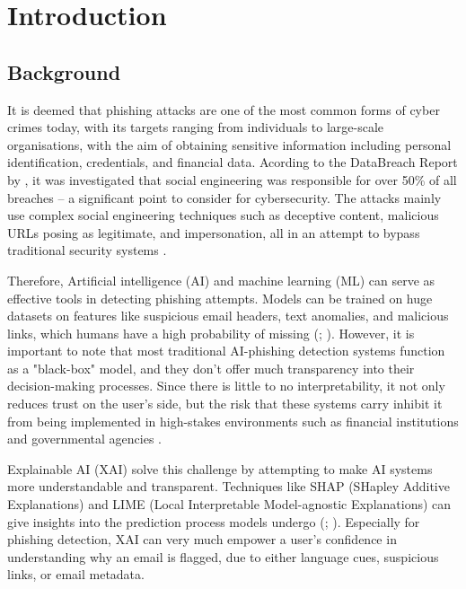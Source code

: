 \section{Introduction}
\label{sec:Introduction}

\subsection*{Background}
It is deemed that phishing attacks are one of the most common forms of cyber crimes today, with its targets ranging from individuals to large-scale organisations, with the aim of obtaining sensitive information including personal identification, credentials, and financial data. Acording to the DataBreach Report by \cite{verizon2023}, it was investigated that social engineering was responsible for over 50\% of all breaches -- a significant point to consider for cybersecurity. The attacks mainly use complex social engineering techniques such as deceptive content, malicious URLs posing as legitimate, and impersonation, all in an attempt to bypass traditional security systems \citep{marett2009effectiveness}. \newline

\noindent Therefore, Artificial intelligence (AI) and machine learning (ML) can serve as effective tools in detecting phishing attempts. Models can be trained on huge datasets on features like suspicious email headers, text anomalies, and malicious links, which humans have a high probability of missing (\cite{chandrasekaran2006phoney}; \cite{jain2022survey}). However, it is important to note that most traditional AI-phishing detection systems function as a "black-box" model, and they don't offer much transparency into their decision-making processes. Since there is little to no interpretability, it not only reduces trust on the user's side, but the risk that these systems carry inhibit it from being implemented in high-stakes environments such as financial institutions and governmental agencies \citep{ribeiro2016model}. \newline

\noindent Explainable AI (XAI) solve this challenge by attempting to make AI systems more understandable and transparent. Techniques like SHAP (SHapley Additive Explanations) and LIME (Local Interpretable Model-agnostic Explanations) can give insights into the prediction process models undergo (\cite{lundberg2017unified}; \cite{ribeiro2016model}). Especially for phishing detection, XAI can very much empower a user's confidence in understanding why an email is flagged, due to either language cues, suspicious links, or email metadata. \newline

